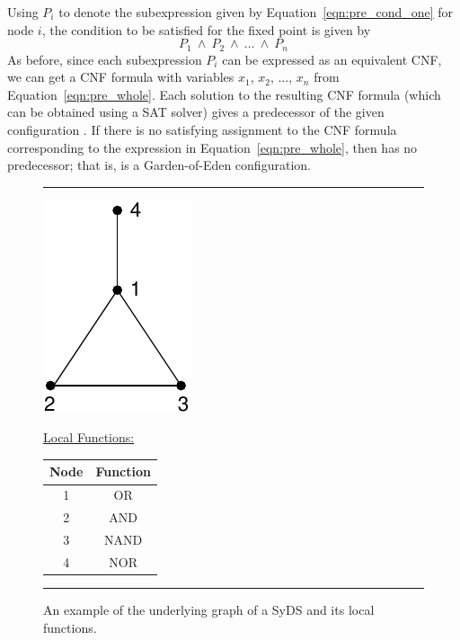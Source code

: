 Using $P_i$ to denote the subexpression given by Equation~\eqref{eqn:pre_cond_one}
for node $i$, the condition to be satisfied for the fixed point is given by 
\begin{equation}\label{eqn:pre_whole}
P_1 ~\wedge~ P_2 ~\wedge~ \ldots ~\wedge~ P_n
\end{equation}
As before, since each subexpression $P_i$ can be expressed as an equivalent CNF, 
we can get a CNF formula with variables $x_1$, $x_2$, $\ldots$, $x_n$
from Equation~\eqref{eqn:pre_whole}. 
Each solution to the resulting CNF formula (which can be obtained using
a SAT solver) gives a predecessor of the given configuration \calc.
If there is no satisfying assignment to the CNF formula corresponding
to the expression in Equation~\eqref{eqn:pre_whole}, then \calc{}
has no predecessor; that is, \calc{} is a Garden-of-Eden configuration.

\medskip


\begin{figure}[tbh]
\rule{\textwidth}{0.01in}
\begin{minipage}{0.3\textwidth}
\centering
\includegraphics[scale=0.7]{./graph_example.pdf}
\end{minipage}
\hspace*{0.5in}
\begin{minipage}{0.6\textwidth}
\underline{\textsf{Local Functions:}}


\noindent
\begin{tabular}{|c|c|}\hline
\textbf{Node} & \textbf{Function} \\ \hline
1  &  OR \\ \hline
2  &  AND \\ \hline
3  &  NAND \\ \hline
4  &  NOR \\ \hline
\end{tabular}
\end{minipage}
\caption{\smallskip An example of the underlying graph of a SyDS and
         its local functions. \medskip}
\label{fig:syds_ex}
\rule{\textwidth}{0.01in}
\end{figure}

